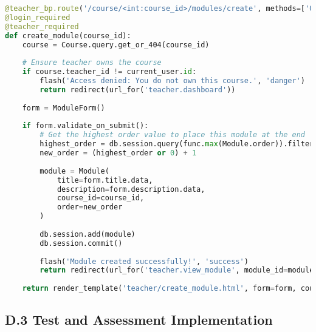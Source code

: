 \begin{lstlisting}[language=Python, caption=Module Creation and Management]
@teacher_bp.route('/course/<int:course_id>/modules/create', methods=['GET', 'POST'])
@login_required
@teacher_required
def create_module(course_id):
    course = Course.query.get_or_404(course_id)
    
    # Ensure teacher owns the course
    if course.teacher_id != current_user.id:
        flash('Access denied: You do not own this course.', 'danger')
        return redirect(url_for('teacher.dashboard'))
    
    form = ModuleForm()
    
    if form.validate_on_submit():
        # Get the highest order value to place this module at the end
        highest_order = db.session.query(func.max(Module.order)).filter_by(course_id=course_id).scalar()
        new_order = (highest_order or 0) + 1
        
        module = Module(
            title=form.title.data,
            description=form.description.data,
            course_id=course_id,
            order=new_order
        )
        
        db.session.add(module)
        db.session.commit()
        
        flash('Module created successfully!', 'success')
        return redirect(url_for('teacher.view_module', module_id=module.id))
    
    return render_template('teacher/create_module.html', form=form, course=course)
\end{lstlisting}

\subsection*{D.3 Test and Assessment Implementation}

